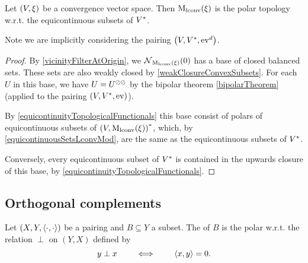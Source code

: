 \begin{proposition} \label{lconvModPolarTopology}
Let $\sSet{V, \xi}$ be a convergence vector space. Then $\operatorname{M_\text{lconv}}(\xi)$ is the polar topology w.r.t. the equicontinuous subsets of ${V}^*$.
\end{proposition}
Note we are implicitly considering the pairing $\sSet{V,\dual{V},\evalMap^d}$.
\begin{proof}
By \ref{vicinityFilterAtOrigin}, we $\operatorname{\mathcal{N}}_{\operatorname{M_\text{lconv}}(\xi)}(0)$ has a base of closed balanced sets. These sets are also weakly closed by \ref{weakClosureConvexSubsets}. For each $U$ in this base, we have $U = U^{\oslash\oslash}$ by the bipolar theorem \ref{bipolarTheorem} (applied to the pairing $\sSet{V,\dual{V}, \evalMap}$).

By \ref{equicontinuityTopologicalFunctionals} this base consist of polars of equicontinuous subsets of $\dual{\sSet{V, \lconvMod(\xi)}}$, which, by \ref{equicontinuousSetsLconvMod}, are the same as the equicontinuous subsets of ${V}^*$.

Conversely, every equicontinuous subset of ${V}^*$ is contained in the upwards closure of this base, by \ref{equicontinuityTopologicalFunctionals}.
\end{proof}



\subsection{Orthogonal complements}
\begin{definition}
Let $\sSet{X,Y,\pair{\cdot,\cdot}}$ be a pairing and $B\subseteq Y$ a subset. The  of $B$ is the polar w.r.t. the relation $\perp$ on $(Y,X)$ defined by
\[ y\perp x \qquad\iff\qquad \left\langle x, y \right\rangle = 0. \]
\end{definition}

